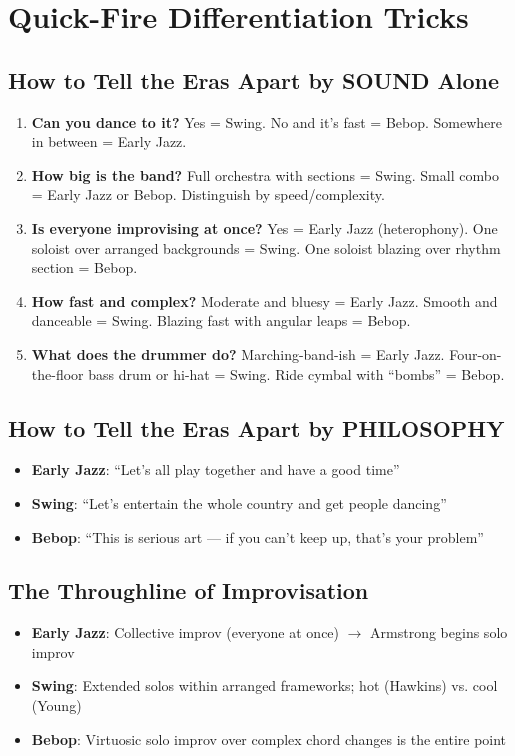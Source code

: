 \documentclass[11pt,letterpaper]{article}
\begin{document}
\section{Quick-Fire Differentiation Tricks}

\subsection{How to Tell the Eras Apart by SOUND Alone}
\begin{enumerate}[leftmargin=1.5em]
  \item \textbf{Can you dance to it?} Yes = Swing. No and it's fast = Bebop. Somewhere in between = Early Jazz.
  \item \textbf{How big is the band?} Full orchestra with sections = Swing. Small combo = Early Jazz or Bebop. Distinguish by speed/complexity.
  \item \textbf{Is everyone improvising at once?} Yes = Early Jazz (heterophony). One soloist over arranged backgrounds = Swing. One soloist blazing over rhythm section = Bebop.
  \item \textbf{How fast and complex?} Moderate and bluesy = Early Jazz. Smooth and danceable = Swing. Blazing fast with angular leaps = Bebop.
  \item \textbf{What does the drummer do?} Marching-band-ish = Early Jazz. Four-on-the-floor bass drum or hi-hat = Swing. Ride cymbal with ``bombs'' = Bebop.
\end{enumerate}

\subsection{How to Tell the Eras Apart by PHILOSOPHY}
\begin{itemize}[leftmargin=1.5em]
  \item \textbf{\textcolor{week1color}{Early Jazz}}: ``Let's all play together and have a good time''
  \item \textbf{\textcolor{week2color}{Swing}}: ``Let's entertain the whole country and get people dancing''
  \item \textbf{\textcolor{week3color}{Bebop}}: ``This is serious art --- if you can't keep up, that's your problem''
\end{itemize}

\subsection{The Throughline of Improvisation}
\begin{itemize}[leftmargin=1.5em]
  \item \textbf{\textcolor{week1color}{Early Jazz}}: Collective improv (everyone at once) $\rightarrow$ Armstrong begins solo improv
  \item \textbf{\textcolor{week2color}{Swing}}: Extended solos within arranged frameworks; hot (Hawkins) vs. cool (Young)
  \item \textbf{\textcolor{week3color}{Bebop}}: Virtuosic solo improv over complex chord changes is the entire point
\end{itemize}
\end{document}
